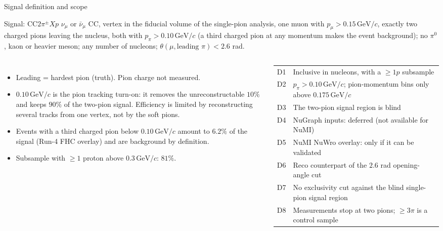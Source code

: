 \documentclass[aspectratio=169,10pt]{beamer}
\newcommand{\GeVc}{\,\text{GeV}/c}
\begin{document}
\begin{frame}{Signal definition and scope}
  \begin{block}{\small Signal: CC$2\pi^\pm Xp$}\small
    $\nu_\mu$ or $\bar\nu_\mu$ CC, vertex in the fiducial volume of the single-pion analysis, one muon with
    $p_\mu>0.15\GeVc$, exactly two charged pions leaving the nucleus, both with $p_\pi>0.10\GeVc$ (a
    third charged pion at any momentum makes the event background); no $\pi^0$, kaon or heavier meson;
    any number of nucleons; $\theta(\mu,\text{leading }\pi)<2.6$ rad.
  \end{block}
  \begin{columns}[T]
  \begin{itemize}\footnotesize\setlength\itemsep{2pt}
    \item Leading = hardest pion (truth). Pion charge not measured.
    \item $0.10\GeVc$ is the pion tracking turn-on: it removes the unreconstructable $10\%$ and keeps
          $90\%$ of the two-pion signal. Efficiency is limited by reconstructing several tracks from one
          vertex, not by the soft pions.
    \item Events with a third charged pion below $0.10\GeVc$ amount to $6.2\%$ of the signal (Run-4 FHC
          overlay) and are background by definition.
    \item Subsample with $\geq1$ proton above $0.3\GeVc$: $81\%$.
  \end{itemize}
  \scriptsize
  \begin{tabular}{lp{}}
    \toprule
    D1 & Inclusive in nucleons, with a $\geq1p$ subsample \\
    D2 & $p_\pi>0.10\GeVc$; pion-momentum bins only above $0.175\GeVc$ \\
    D3 & The two-pion signal region is blind \\
    D4 & NuGraph inputs: deferred (not available for NuMI) \\
    D5 & NuMI NuWro overlay: only if it can be validated \\
    D6 & Reco counterpart of the $2.6$ rad opening-angle cut \\
    D7 & No exclusivity cut against the blind single-pion signal region \\
    D8 & Measurements stop at two pions; $\geq3\pi$ is a control sample \\
    \bottomrule
  \end{tabular}
  \end{columns}
\end{frame}
\end{document}
